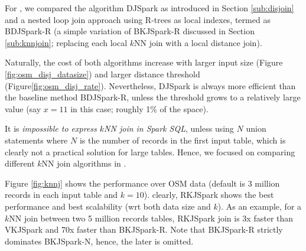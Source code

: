 For \name, we compared the algorithm DJSpark as introduced in Section
\ref{sub:disjoin} and a nested loop join approach using R-trees as
local indexes, termed as BDJSpark-R (a simple variation of BKJSpark-R
discussed in Section \ref{sub:knnjoin}; replacing each local $k$NN
join with a local distance join).


Naturally, the cost of both algorithms increase with larger input size
(Figure \ref{fig:osm_disj_datasize}) and larger distance threshold
(Figure\ref{fig:osm_disj_rate}). Nevertheless, DJSpark is always more
efficient than the baseline method BDJSpark-R, unless the threshold
grows to a relatively large value (say $x=11$ in this case; roughly
1\% of the space). %


It is {\em impossible to express $k$NN join in Spark SQL}, unless
using $N$ union statements where $N$ is the number of records in the
first input table, which is clearly not a practical solution for large
tables. Hence, we focused on comparing different $k$NN join algorithms
in \name.

Figure \ref{fig:knnj} shows the performance over OSM data (default is
$3$ million records in each input table and $k=10$). clearly, RKJSpark
shows the best performance and best scalability (wrt both data size
and $k$). As an example, for a $k$NN join between two 5 million
records tables, RKJSpark join is 3x faster than VKJSpark and 70x
faster than BKJSpark-R. Note that BKJSpark-R strictly dominates
BKJSpark-N, hence, the later is omitted.


